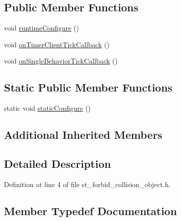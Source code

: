 \subsection*{Public Member Functions}
\begin{DoxyCompactItemize}
\item 
void \hyperlink{structsm__mtc__picknplace_1_1StForbidCollisionObject_adfcf7e4de51f35ceb4daa168d15c675c}{runtime\+Configure} ()
\item 
void \hyperlink{structsm__mtc__picknplace_1_1StForbidCollisionObject_a43f903fa4f881600ab1b7f2ee29ec457}{on\+Timer\+Client\+Tick\+Callback} ()
\item 
void \hyperlink{structsm__mtc__picknplace_1_1StForbidCollisionObject_a79af36073b89e9209706122a4e96468c}{on\+Single\+Behavior\+Tick\+Callback} ()
\end{DoxyCompactItemize}
\subsection*{Static Public Member Functions}
\begin{DoxyCompactItemize}
\item 
static void \hyperlink{structsm__mtc__picknplace_1_1StForbidCollisionObject_a0bc6f14c134ded8a7225b2b8d633cbfb}{static\+Configure} ()
\end{DoxyCompactItemize}
\subsection*{Additional Inherited Members}


\subsection{Detailed Description}


Definition at line 4 of file st\+\_\+forbid\+\_\+collision\+\_\+object.\+h.



\subsection{Member Typedef Documentation}
